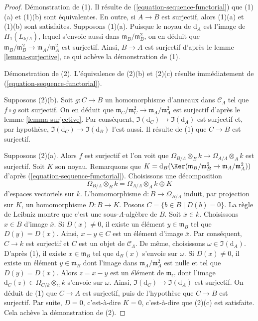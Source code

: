 \begin{proof}
Démonstration de (1). Il résulte de (\ref{equation-sequence-functorial}) que
(1)(a) et (1)(b) sont équivalentes. En outre, si $A \to B$ est surjectif,
alors (1)(a) et (1)(b) sont satisfaites. Supposons (1)(a). Puisque le noyau de
$\text{d}_A$ est l'image de $H_1(L_{k/\Lambda})$, lequel s'envoie aussi dans
$\mathfrak m_B/\mathfrak m_B^2$, on en déduit que
$\mathfrak m_B/\mathfrak m_B^2 \to \mathfrak m_A/\mathfrak m_A^2$
est surjectif. Ainsi, $B \to A$ est surjectif d'après le lemme
\ref{lemma-surjective}, ce qui achève la démonstration de (1).

\medskip\noindent
Démonstration de (2). L'équivalence de (2)(b) et (2)(c) résulte immédiatement
de (\ref{equation-sequence-functorial}).

\medskip\noindent
Supposons (2)(b). Soit $g : C \to B$ un homomorphisme d'anneaux dans
$\mathcal{C}_\Lambda$ tel que $f \circ g$ soit surjectif. On en déduit que
$\mathfrak m_C/\mathfrak m_C^2 \to \mathfrak m_A/\mathfrak m_A^2$
est surjectif d'après le lemme \ref{lemma-surjective}. Par conséquent,
$\Im(\text{d}_C) \to \Im(\text{d}_A)$ est surjectif et, par hypothèse,
$\Im(\text{d}_C) \to \Im(\text{d}_B)$ l'est aussi. Il résulte de (1) que
$C \to B$ est surjectif.

\medskip\noindent
Supposons (2)(a). Alors $f$ est surjectif et l'on voit que
$\Omega_{B/\Lambda} \otimes_B k \to \Omega_{A/\Lambda} \otimes_A k$
est surjectif. Soit $K$ son noyau. Remarquons que
$K = \text{d}_B(\Ker(\mathfrak m_B/\mathfrak m_B^2 \to
\mathfrak m_A/\mathfrak m_A^2))$ d'après
(\ref{equation-sequence-functorial}). Choisissons une décomposition
$$
\Omega_{B/\Lambda} \otimes_B k =
\Omega_{A/\Lambda} \otimes_A k \oplus K
$$
d'espaces vectoriels sur $k$. L'homomorphisme
$\text{d} : B \to \Omega_{B/\Lambda}$ induit, par projection sur $K$, un
homomorphisme $D : B \to K$. Posons
$C = \{b \in B \mid D(b) = 0\}$. La règle de Leibniz montre que c'est une
sous-$\Lambda$-algèbre de $B$. Soit $\overline{x} \in k$. Choisissons
$x \in B$ d'image $\overline{x}$. Si $D(x) \not = 0$, il existe un élément
$y \in \mathfrak m_B$ tel que $D(y) = D(x)$. Ainsi, $x - y \in C$ est un
élément d'image $\overline{x}$. Par conséquent, $C \to k$ est surjectif et
$C$ est un objet de $\mathcal{C}_\Lambda$. De même, choisissons
$\omega \in \Im(\text{d}_A)$. D'après (1), il existe
$x \in \mathfrak m_B$ tel que $\text{d}_B(x)$ s'envoie sur $\omega$. Si
$D(x) \not = 0$, il existe un élément $y \in \mathfrak m_B$ dont l'image dans
$\mathfrak m_A/\mathfrak m_A^2$ est nulle et tel que $D(y) = D(x)$.
Alors $z = x - y$ est un élément de $\mathfrak m_C$ dont l'image
$\text{d}_C(z) \in \Omega_{C/k} \otimes_C k$ s'envoie sur $\omega$.
Ainsi, $\Im(\text{d}_C) \to \Im(\text{d}_A)$ est surjectif. On déduit de
(1) que $C \to A$ est surjectif, puis de l'hypothèse que $C \to B$ est
surjectif. Par suite, $D = 0$, c'est-à-dire $K = 0$, c'est-à-dire que (2)(c)
est satisfaite. Cela achève la démonstration de (2).


\end{proof}
